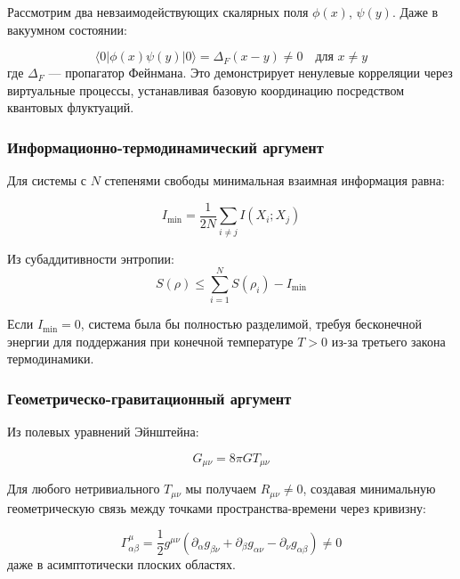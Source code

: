 \documentclass[11pt,a4paper]{article}
\begin{document}
	Рассмотрим два невзаимодействующих скалярных поля $\phi(x)$, $\psi(y)$. Даже в вакуумном состоянии:
	
	\begin{equation}
		\langle 0 | \phi(x) \psi(y) | 0 \rangle = \Delta_F(x-y) \neq 0 \quad \text{для } x \neq y
	\end{equation}
	где $\Delta_F$ — пропагатор Фейнмана. Это демонстрирует ненулевые корреляции через виртуальные процессы, устанавливая базовую координацию посредством квантовых флуктуаций.
	
	\subsubsection{Информационно-термодинамический аргумент}
	
	Для системы с $N$ степенями свободы минимальная взаимная информация равна:
	
	\begin{equation}
		I_{\min} = \frac{1}{2N} \sum_{i \neq j} I(X_i; X_j)
	\end{equation}
	
	Из субаддитивности энтропии:
	\begin{equation}
		S(\rho) \leq \sum_{i=1}^N S(\rho_i) - I_{\min}
	\end{equation}
	
	Если $I_{\min} = 0$, система была бы полностью разделимой, требуя бесконечной энергии для поддержания при конечной температуре $T > 0$ из-за третьего закона термодинамики.
	
	\subsubsection{Геометрическо-гравитационный аргумент}
	
	Из полевых уравнений Эйнштейна:
	
	\begin{equation}
		G_{\mu\nu} = 8\pi G T_{\mu\nu}
	\end{equation}
	
	Для любого нетривиального $T_{\mu\nu}$ мы получаем $R_{\mu\nu} \neq 0$, создавая минимальную геометрическую связь между точками пространства-времени через кривизну:
	
	\begin{equation}
		\Gamma^\mu_{\alpha\beta} = \frac{1}{2} g^{\mu\nu}(\partial_\alpha g_{\beta\nu} + \partial_\beta g_{\alpha\nu} - \partial_\nu g_{\alpha\beta}) \neq 0
	\end{equation}
	даже в асимптотически плоских областях.
	
\end{document}
